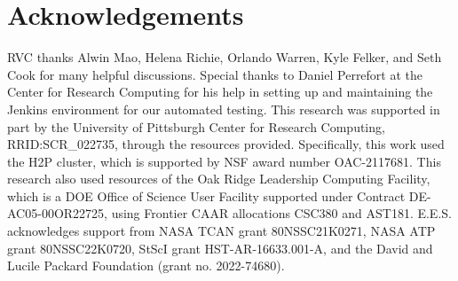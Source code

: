 \documentclass[modern, linenumbers]{aastex631}
\begin{document}
\section{Acknowledgements}

RVC thanks Alwin Mao, Helena Richie, Orlando Warren, Kyle Felker, and Seth Cook for many helpful discussions. Special thanks to Daniel Perrefort at the Center for Research Computing for his help in setting up and maintaining the Jenkins environment for our automated testing. This research was supported in part by the University of Pittsburgh Center for Research Computing, RRID:SCR\_022735, through the resources provided. Specifically, this work used the H2P cluster, which is supported by NSF award number OAC-2117681. This research also used resources of the Oak Ridge Leadership Computing Facility, which is a DOE Office of Science User Facility supported under Contract DE-AC05-00OR22725, using Frontier CAAR allocations CSC380 and AST181. E.E.S. acknowledges support from NASA TCAN grant 80NSSC21K0271, NASA ATP grant 80NSSC22K0720, StScI grant HST-AR-16633.001-A, and the David and Lucile Packard Foundation (grant no. 2022-74680).



\end{document}
